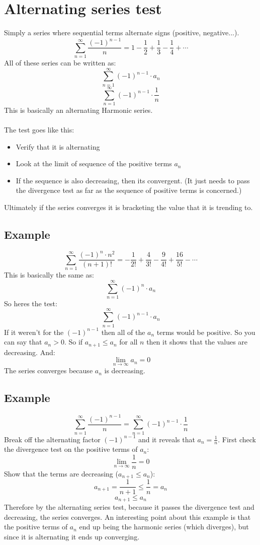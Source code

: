 \documentclass{report}
\begin{document}
\section{Alternating series test}
    Simply a series where sequential terms alternate signs (positive, negative...). 
    \[\sum_{n = 1}^{\infty} \frac{(-1)^{n-1}}{n} = 1 - \frac{1}{2} + \frac{1}{3} - \frac{1}{4} + \cdots \]
    All of these series can be written as:
    \[\sum_{n = 1}^{\infty}  (-1)^{n-1} \cdot a_n\]
    \[\sum_{n = 1}^{\infty} (-1)^{n-1} \cdot \frac{1}{n}\]
    This is basically an alternating Harmonic series.\\
    \\
    The test goes like this:
    \begin{itemize}
        \item Verify that it is alternating
        \item Look at the limit of sequence of the positive terms \(a_n\)
        \item If the sequence is also decreasing, then its convergent. (It just needs to pass the divergence test as far as the sequence of positive terms is concerned.)
    \end{itemize}
    Ultimately if the series converges it is bracketing the value that it is trending to.
    \subsection{Example}
        \[\sum_{n = 1}^{\infty}  \frac{(-1)^n \cdot n^2}{(n+1)!} = -\frac{1}{2!} + \frac{4}{3!} - \frac{9}{4!} + \frac{16}{5!} - \cdots \]
        This is basically the same as:
        \[\sum_{n = 1}^{\infty} (-1)^n \cdot a_n \]
        So heres the test:
        \[\sum_{n = 1}^{\infty} (-1)^{n-1} \cdot a_n \]
        If it weren't for the \((-1)^{n-1}\) then all of the \(a_n\) terms would be positive. So you can say that \(a_n > 0\).
        So if \(a_{n+1} \leq a_n\) for all \(n\) then it shows that the values are decreasing. And:
        \[\lim_{n \to \infty} a_n  = 0\]
        The series converges because \(a_n\) is decreasing.
    
    \subsection{Example}
        \[\sum_{n = 1}^{\infty} \frac{(-1)^{n-1}}{n} = \sum_{n = 1}^{\infty} (-1)^{n-1} \cdot \frac{1}{n}\]
        Break off the alternating factor \((-1)^{n-1}\) and it reveals that \(a_n = \frac{1}{n}\). 
        First check the divergence test on the positive terms of \(a_n\):
        \[\lim_{n \to \infty} \frac{1}{n} = 0\]
        Show that the terms are decreasing (\(a_{n+1} \leq a_n\)):
        \[a_{n+1} = \frac{1}{n+1} \leq \frac{1}{n} = a_n\]
        \[a_{n+1} \leq a_n\]
        Therefore by the alternating series test, because it passes the divergence test and decreasing, the series converges.
        An interesting point about this example is that the positive terms of \(a_n\) end up being the harmonic series (which diverges), but since it is alternating it ends up converging.
        
\end{document}
